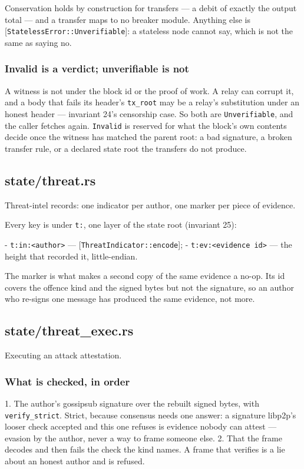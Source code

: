\documentclass[11pt,a4paper]{article}
\begin{document}
Conservation holds by construction for transfers — a debit of exactly the
output total — and a transfer maps to no breaker module. Anything else is
[\texttt{StatelessError::Unverifiable}]: a stateless node cannot say, which is not
the same as saying no.

\subsubsection{Invalid is a verdict; unverifiable is not}

A witness is not under the block id or the proof of work. A relay can
corrupt it, and a body that fails its header's \texttt{tx\_root} may be a relay's
substitution under an honest header — invariant 24's censorship case. So
both are \texttt{Unverifiable}, and the caller fetches again. \texttt{Invalid} is reserved
for what the block's own contents decide once the witness has matched the
parent root: a bad signature, a broken transfer rule, or a declared state
root the transfers do not produce.

\subsection{state/threat.rs}
Threat-intel records: one indicator per author, one marker per piece of
evidence.

Every key is under \texttt{t:}, one layer of the state root (invariant 25):

- \texttt{t:in:<author>} — [\texttt{ThreatIndicator::encode}];
- \texttt{t:ev:<evidence id>} — the height that recorded it, little-endian.

The marker is what makes a second copy of the same evidence a no-op. Its id
covers the offence kind and the signed bytes but not the signature, so an
author who re-signs one message has produced the same evidence, not more.

\subsection{state/threat\_exec.rs}
Executing an attack attestation.

\subsubsection{What is checked, in order}

1. The author's gossipsub signature over the rebuilt signed bytes, with
   \texttt{verify\_strict}. Strict, because consensus needs one answer: a signature
   libp2p's looser check accepted and this one refuses is evidence nobody can
   attest — evasion by the author, never a way to frame someone else.
2. That the frame decodes and then fails the check the kind names. A frame
   that verifies is a lie about an honest author and is refused.
\end{document}
